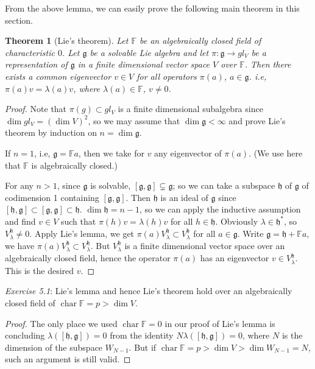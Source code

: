 \documentclass[10pt,twoside]{article}
\newcommand{\Ff}{\mathbb F}
\newcommand{\mg}{\mathfrak{g}}
\newcommand{\mh}{\mathfrak{h}}
\newtheorem{theorem}{Theorem}
\theoremstyle{definition}
\theoremstyle{remark}
\begin{document}
From the above lemma, we can easily prove the following main theorem in this section.
\begin{theorem}[Lie's theorem]
Let $\Ff$ be an algebraically closed field of characteristic $0$.  Let $\mg$ be a solvable Lie algebra and let $\pi: \mg \rightarrow gl_V$ be a representation of $\mg$ in a finite dimensional vector space $V$ over $\Ff$.  Then there exists a common eigenvector $v\in V$ for all operators $\pi(a)$, $a\in \mg$. 
i.e, $\pi(a)v=\lambda(a)v$, where $\lambda(a)\in \Ff$, $v\neq 0$. 
\end{theorem}

\begin{proof}
Note that $\pi(g) \subset gl_V$ is a finite dimensional subalgebra since $\operatorname{dim}gl_V=(\operatorname{dim}V)^2$, so we may assume that $\operatorname{dim}{\mg}<\infty$ and prove Lie's theorem by induction on $n=\operatorname{dim}\mg$.

If $n=1$, i.e, $\mg=\Ff a$, then we take for $v$ any eigenvector of $\pi(a)$.  (We use here that $\Ff$ is algebraically closed.)

For any $n> 1$, since $\mg$ is solvable, $[\mg, \mg] \subsetneq \mg$; so we can take a subspace $\mh$ of $\mg$ of codimension 1 containing $[\mg, \mg]$. Then $\mh$ is an ideal of $\mg$ since $[\mh, \mg] \subset [\mg, \mg] \subset \mh$.  $\operatorname{dim}\mh=n-1$, so we can apply the inductive assumption and find $v\in V$ such that $\pi(h)v=\lambda(h)v$ for all $h\in \mh$.  Obviously $\lambda \in \mh^*$, so $V_\lambda^\mh \neq 0$.  Apply Lie's lemma, we get $\pi(a)V_\lambda^\mh \subset V^\mh_\lambda$ for all $a\in \mg$.  Write $\mg=\mh+\Ff a$, we have $\pi(a)V^\mh_\lambda \subset V^\mh_\lambda$.  But $V^\mh_\lambda$ is a finite dimensional vector space over an algebraically closed field, hence the operator $\pi(a)$ has an eigenvector $v\in V^\mh_\lambda$.  This is the desired $v$.  
\end{proof}   


\noindent
{\em Exercise 5.1}: Lie's lemma and hence Lie's theorem hold over an algebraically closed field of $\operatorname{char}\Ff=p> \dim V$.

\begin{proof}
The only place we used $\operatorname{char}\Ff =0$ in our proof of Lie's lemma is concluding $\lambda([\mh, \mg])=0$ from the identity $N\lambda([\mh,\mg])=0$, where $N$ is the dimension of the subspace $W_{N-1}$.  But if $\operatorname{char}\Ff=p> \dim V > \dim W_{N-1}=N$, such an argument is still valid.  
\end{proof}
\end{document}
